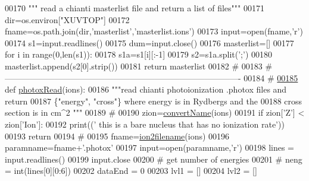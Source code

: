 \begin{DoxyCode}
{{00170     \textcolor{stringliteral}{""" read a chianti masterlist file and return a list of files"""}
00171     dir=os.environ[\textcolor{stringliteral}{"XUVTOP"}]
00172     fname=os.path.join(dir,\textcolor{stringliteral}{'masterlist'},\textcolor{stringliteral}{'masterlist.ions'})
00173     input=open(fname,\textcolor{stringliteral}{'}\textcolor{stringliteral}{r')}
00174 \textcolor{stringliteral}{    s1=input.readlines()}
00175 \textcolor{stringliteral}{    dum=input.close()}
00176 \textcolor{stringliteral}{    masterlist=[]}
00177 \textcolor{stringliteral}{    }\textcolor{keywordflow}{for} i \textcolor{keywordflow}{in} range(0,len(s1)):
00178         s1a=s1[i][:-1]
00179         s2=s1a.split(\textcolor{stringliteral}{';'})
00180         masterlist.append(s2[0].strip())
00181     \textcolor{keywordflow}{return} masterlist
00182     \textcolor{comment}{#}
00183     \textcolor{comment}{# -------------------------------------------------------------------------------------}
00184     \textcolor{comment}{#}
\hypertarget{__chianti__tools_8py_source_l00185}{}\hyperlink{namespacepyneb_1_1utils_1_1__chianti__tools_ac5c830808b3221d5f11b3e2d83b6140d}{00185} \textcolor{keyword}{def }\hyperlink{namespacepyneb_1_1utils_1_1__chianti__tools_ac5c830808b3221d5f11b3e2d83b6140d}{photoxRead}(ions):
00186     \textcolor{stringliteral}{"""read chianti photoionization .photox files and return}
00187 \textcolor{stringliteral}{        \{"energy", "cross"\} where energy is in Rydbergs and the}
00188 \textcolor{stringliteral}{        cross section is in cm^2  """}
00189     \textcolor{comment}{#}
00190     zion=\hyperlink{namespacepyneb_1_1utils_1_1__chianti__tools_a92cf299ad3407ee8923739e2761ab13f}{convertName}(ions)
00191     \textcolor{keywordflow}{if} zion[\textcolor{stringliteral}{'Z'}] < zion[\textcolor{stringliteral}{'Ion'}]:
00192         print((\textcolor{stringliteral}{' this is a bare nucleus that has no ionization rate'}))
00193         \textcolor{keywordflow}{return}
00194     \textcolor{comment}{#}
00195     fname=\hyperlink{namespacepyneb_1_1utils_1_1__chianti__tools_ad4bc7b577fd4c3819ceb00b0a444351b}{ion2filename}(ions)
00196     paramname=fname+\textcolor{stringliteral}{'.photox'}
00197     input=open(paramname,\textcolor{stringliteral}{'}\textcolor{stringliteral}{r')}
00198 \textcolor{stringliteral}{    lines = input.readlines()}
00199 \textcolor{stringliteral}{    input.close}
00200 \textcolor{stringliteral}{    }\textcolor{comment}{# get number of energies}
00201 \textcolor{comment}{#    neng = int(lines[0][0:6])}
00202     dataEnd = 0
00203     lvl1 = []
00204     lvl2 = []
}}
\end{DoxyCode}
